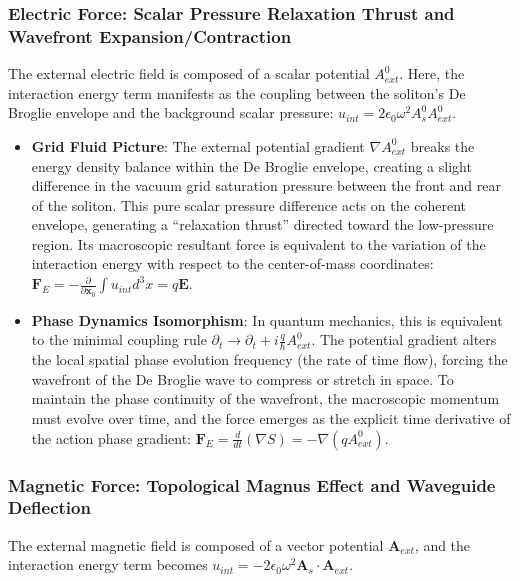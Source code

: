 \documentclass[12pt, a4paper]{article}
\begin{document}
\subsubsection{Electric Force: Scalar Pressure Relaxation Thrust and Wavefront Expansion/Contraction}

The external electric field is composed of a scalar potential $A^0_{ext}$. Here, the interaction energy term manifests as the coupling between the soliton's De Broglie envelope and the background scalar pressure: $u_{int} = 2 \epsilon_0 \omega^2 A^0_s A^0_{ext}$.

\begin{itemize}
    \item \textbf{Grid Fluid Picture}: The external potential gradient $\nabla A^0_{ext}$ breaks the energy density balance within the De Broglie envelope, creating a slight difference in the vacuum grid saturation pressure between the front and rear of the soliton. This pure scalar pressure difference acts on the coherent envelope, generating a ``relaxation thrust'' directed toward the low-pressure region. Its macroscopic resultant force is equivalent to the variation of the interaction energy with respect to the center-of-mass coordinates: $\mathbf{F}_E = - \frac{\partial}{\partial \mathbf{x}_0} \int u_{int} d^3x = q \mathbf{E}$.
    \item \textbf{Phase Dynamics Isomorphism}: In quantum mechanics, this is equivalent to the minimal coupling rule $\partial_t \to \partial_t + i \frac{q}{\hbar} A^0_{ext}$. The potential gradient alters the local spatial phase evolution frequency (the rate of time flow), forcing the wavefront of the De Broglie wave to compress or stretch in space. To maintain the phase continuity of the wavefront, the macroscopic momentum must evolve over time, and the force emerges as the explicit time derivative of the action phase gradient: $\mathbf{F}_E = \frac{d}{dt}(\nabla S) = - \nabla (q A^0_{ext})$.
\end{itemize}

\subsubsection{Magnetic Force: Topological Magnus Effect and Waveguide Deflection}

The external magnetic field is composed of a vector potential $\mathbf{A}_{ext}$, and the interaction energy term becomes $u_{int} = - 2 \epsilon_0 \omega^2 \mathbf{A}_s \cdot \mathbf{A}_{ext}$.
\end{document}
